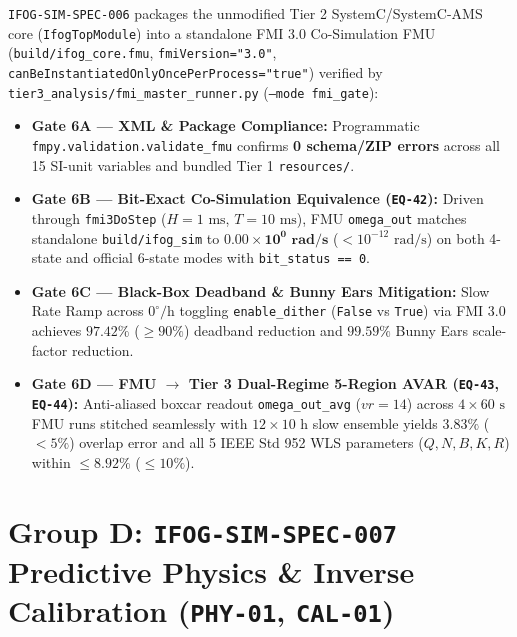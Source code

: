 \documentclass[11pt,a4paper]{article}
\begin{document}
\texttt{IFOG-SIM-SPEC-006} packages the unmodified Tier 2 SystemC/SystemC-AMS core (\texttt{IfogTopModule}) into a standalone FMI 3.0 Co-Simulation FMU (\texttt{build/ifog\_core.fmu}, \texttt{fmiVersion="3.0"}, \texttt{canBeInstantiatedOnlyOncePerProcess="true"}) verified by \texttt{tier3\_analysis/fmi\_master\_runner.py} (\texttt{--mode fmi\_gate}):
\begin{itemize}
    \item \textbf{Gate 6A --- XML \& Package Compliance:} Programmatic \texttt{fmpy.validation.validate\_fmu} confirms \textbf{0 schema/ZIP errors} across all 15 SI-unit variables and bundled Tier 1 \texttt{resources/}.
    \item \textbf{Gate 6B --- Bit-Exact Co-Simulation Equivalence (\texttt{EQ-42}):} Driven through \texttt{fmi3DoStep} ($H = 1\text{ ms}$, $T=10\text{ ms}$), FMU \texttt{omega\_out} matches standalone \texttt{build/ifog\_sim} to $\mathbf{0.00\times 10^{0}\text{ rad/s}}$ ($< 10^{-12}\text{ rad/s}$) on both 4-state and official 6-state modes with \texttt{bit\_status == 0}.
    \item \textbf{Gate 6C --- Black-Box Deadband \& Bunny Ears Mitigation:} Slow Rate Ramp across $0^\circ/\text{h}$ toggling \texttt{enable\_dither} (\texttt{False} vs \texttt{True}) via FMI 3.0 achieves $\mathbf{97.42\%}$ ($\ge 90\%$) deadband reduction and $\mathbf{99.59\%}$ Bunny Ears scale-factor reduction.
    \item \textbf{Gate 6D --- FMU $\to$ Tier 3 Dual-Regime 5-Region AVAR (\texttt{EQ-43}, \texttt{EQ-44}):} Anti-aliased boxcar readout \texttt{omega\_out\_avg} ($vr=14$) across $4\times 60\text{ s}$ FMU runs stitched seamlessly with $12\times 10\text{ h}$ slow ensemble yields $\mathbf{3.83\%}$ ($< 5\%$) overlap error and all 5 IEEE Std 952 WLS parameters ($Q, N, B, K, R$) within $\mathbf{\le 8.92\%}$ ($\le 10\%$).
\end{itemize}

\section{Group D: \texttt{IFOG-SIM-SPEC-007} Predictive Physics \& Inverse Calibration (\texttt{PHY-01}, \texttt{CAL-01})}
\end{document}
